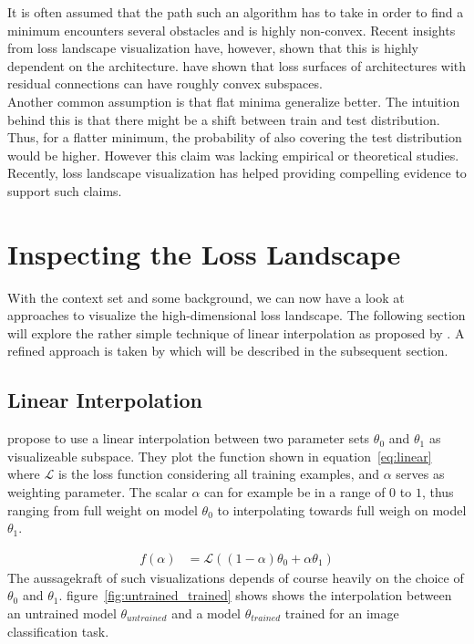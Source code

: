 \documentclass[a4paper]{scrartcl}
\begin{document}
It is often assumed that the path such an algorithm has to take in order to find a minimum encounters several obstacles and is highly non-convex. Recent insights from loss landscape visualization have, however, shown that this is highly dependent on the architecture. \citet{li2017visualizing} have shown that loss surfaces of architectures with residual connections can have roughly convex subspaces.\\
Another common assumption is that flat minima generalize better. The intuition behind this is that there might be a shift between train and test distribution. Thus, for a flatter minimum, the probability of also covering the test distribution would be higher. However this claim was lacking empirical or theoretical studies. Recently, loss landscape visualization has helped providing compelling evidence to support such claims.



\section*{Inspecting the Loss Landscape}
With the context set and some background, we can now have a look at approaches to visualize the high-dimensional loss landscape. The following section will explore the rather simple technique of linear interpolation as proposed by \citet{goodfellow2014qualitatively}. A refined approach is taken by \citet{li2017visualizing} which will be described in the subsequent section.



\subsection*{Linear Interpolation}
\citet{goodfellow2014qualitatively} propose to use a linear interpolation between two parameter sets $\theta_0$ and $\theta_1$ as visualizeable subspace. They plot the function shown in equation~\ref{eq:linear} where $\mathcal{L}$ is the loss function considering all training examples, and $\alpha$ serves as weighting parameter. The scalar $\alpha$ can for example be in a range of $0$ to $1$, thus ranging from full weight on model $\theta_0$ to interpolating towards full weigh on model $\theta_1$.

\begin{align}
\label{eq:linear}
	f(\alpha) &= \mathcal{L}((1-\alpha) \theta_0 + \alpha \theta_1)
\end{align}
The aussagekraft of such visualizations depends of course heavily on the choice of $\theta_0$ and $\theta_1$. figure~\ref{fig:untrained_trained} shows shows the interpolation between an untrained model $\theta_{untrained}$ and a model $\theta_{trained}$ trained for an image classification task.
\end{document}

